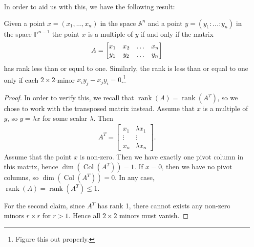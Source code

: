 \documentclass{article}
\newcommand{\A}{\mathbb{A}}
\renewcommand{\P}{\mathbb{P}}
\DeclareMathOperator{\rank}{rank}
\DeclareMathOperator{\col}{Col}
\begin{document}
In order to aid us with this, we have the following result:
\begin{corollary}
    \label{crl:minors}
    Given a point $x = (x_1, \ldots, x_n)$ in the space $\A^n$ and a point $y =
    \left( y_1 : \ldots : y_n \right)$ in the space $\P^{n-1}$ the point
    $x$ is a multiple of $y$ if and only if the matrix
    \begin{equation}
        \notag
        A = 
        \begin{bmatrix}
            x_1 & x_2 & \hdots & x_n \\
            y_1 & y_2 & \hdots & y_n
        \end{bmatrix}
    \end{equation}
    has rank less than or equal to one. Similarly, the rank is less than or
    equal to one only if each $2\times2$-minor $x_iy_j - x_jy_i =
    0$.\footnote{Figure this out properly.}
\end{corollary}
\begin{proof}
    In order to verify this, we recall that $\rank(A) = \rank(A^T)$, so we
    chose to work with the transposed matrix instead. Assume that $x$ is a
    multiple of $y$, so $y = \lambda x$ for some scalar $\lambda$.  Then
    \begin{align*}
        A^T = \begin{bmatrix}
            x_1 & \lambda x_1 \\
            \vdots & \vdots \\
            x_n & \lambda x_n
        \end{bmatrix}.
    \end{align*}
    Assume that the point $x$ is non-zero. Then we have exactly one pivot
    column in this matrix, hence $\dim(\col(A^T)) = 1$. If $x = 0$, then we have
    no pivot columns, so $\dim(\col(A^T)) = 0$. In any case, $\rank(A) =
    \rank(A^T) \leq 1$.

    For the second claim, since $A^T$ has rank 1, there cannot exists any
    non-zero minors $r\times r$ for $r > 1$. Hence all $2\times 2$ minors must
    vanish.
\end{proof}
\end{document}
